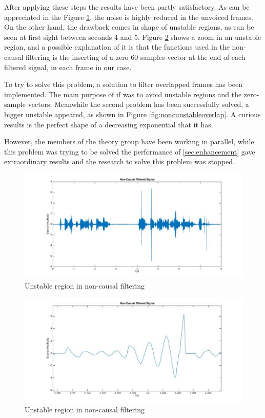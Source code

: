 \documentclass[11pt,a4paper,english]{book}  %
\theoremstyle{definition}  %
\theoremstyle{plain}  %
\theoremstyle{remark}  %
\begin{document}
		After applying these steps the results have been partly satisfactory. As can be appreciated in the Figure \ref{fig:nonc}, the noise is highly reduced in the unvoiced frames. On the other hand, the drawback comes in shape of unstable regions, as can be seen at first sight between seconds 4 and 5. Figure \ref{fig:noncunstable} shows a zoom in an unstable region, and a possible explanation of it is that the functions used in the non-causal filtering is the inserting of a zero 60 samples-vector at the end of each filtered signal, in each frame in our case.
		
		To try to solve this problem, a solution to filter overlapped frames has been implemented. The main purpose of if was to avoid unstable regions and the zero-sample vectors. Meanwhile the second problem has been successfully solved, a bigger unstable appeared, as shown in Figure \ref{fig:noncunstableoverlap}. A curious results is the perfect shape of a decreasing exponential that it has.
		
		However, the members of the theory group have been working in parallel, while this problem was trying to be solved the performance of \ref{sec:enhancement} gave extraordinary results and the research to solve this problem was stopped.
		
	
		
		\begin{figure}[h]
		\centering
		\includegraphics[width=15cm]{images/theory/nonc.jpg}
		\caption{Unstable region in non-causal filtering}
		\label{fig:nonc}
		\end{figure}		
		
		\begin{figure}[h]
		\centering
		\includegraphics[width=15cm]{images/theory/noncunstable.jpg}
		\caption{Unstable region in non-causal filtering}
		\label{fig:noncunstable}
		\end{figure}
		
\end{document}
